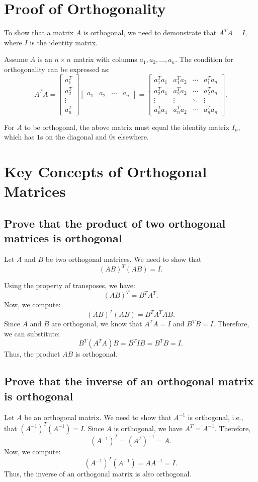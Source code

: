 \documentclass{article}
\begin{document}
\section*{Proof of Orthogonality}
To show that a matrix $A$ is orthogonal, we need to demonstrate that $A^T A = I$, where $I$ is the identity matrix.

Assume $A$ is an $n \times n$ matrix with columns $a_1, a_2, \ldots, a_n$. The condition for orthogonality can be expressed as:
\[A^T A = \begin{bmatrix}
a_1^T \\
a_2^T \\
\vdots \\
a_n^T
\end{bmatrix}\begin{bmatrix}
a_1 & a_2 & \cdots & a_n
\end{bmatrix} = \begin{bmatrix}
a_1^T a_1 & a_1^T a_2 & \cdots & a_1^T a_n \\
a_2^T a_1 & a_2^T a_2 & \cdots & a_2^T a_n \\
\vdots & \vdots & \ddots & \vdots \\
a_n^T a_1 & a_n^T a_2 & \cdots & a_n^T a_n
\end{bmatrix}.\]

For $A$ to be orthogonal, the above matrix must equal the identity matrix $I_n$, which has $1$s on the diagonal and $0$s elsewhere.

\section*{Key Concepts of Orthogonal Matrices}
\subsection*{Prove that the product of two orthogonal matrices is orthogonal}
Let $A$ and $B$ be two orthogonal matrices. We need to show that
\[(AB)^T (AB) = I.\]

Using the property of transposes, we have:
\[(AB)^T = B^T A^T.\]
Now, we compute:
\[(AB)^T (AB) = B^T A^T AB.\]
Since $A$ and $B$ are orthogonal, we know that $A^T A = I$ and $B^T B = I$. Therefore, we can substitute:
\[B^T (A^T A) B = B^T I B = B^T B = I.\]
Thus, the product $AB$ is orthogonal.

\subsection*{Prove that the inverse of an orthogonal matrix is orthogonal}
Let $A$ be an orthogonal matrix. We need to show that $A^{-1}$ is orthogonal, i.e., that $(A^{-1})^T (A^{-1}) = I$.
Since $A$ is orthogonal, we have $A^T = A^{-1}$. Therefore,
\[(A^{-1})^T = (A^T)^{-1} = A.\]
Now, we compute:
\[(A^{-1})^T (A^{-1}) = A A^{-1} = I.\]
Thus, the inverse of an orthogonal matrix is also orthogonal.
\end{document}
